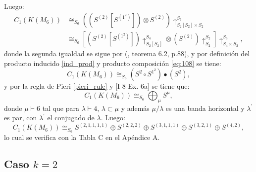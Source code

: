\documentclass[12pt]{book}
\theoremstyle{definition}
\newcounter{in}
\newcounter{ini}
\begin{document}
Luego:
\begin{equation}
\begin{aligned}
C_{1}(K(M_{6})) & \cong_{S_{6}} ((S^{(2)} \left [ S^{(1^{2})} \right ]) \otimes S^{(2)}) \uparrow_{S_{2} \left [ S_{2} \right ] \times S_{2}}^{S_{6}} \\
& \cong_{S_{6}} \left [ (S^{(2)} \left [ S^{(1^{2})} \right ]) \uparrow_{S_{2} \left [ S_{2} \right ]}^{S_{4}} \otimes (S^{(2)}) \uparrow_{S_{2}}^{S_{2}} \right ] \uparrow_{S_{4} \times S_{2}}^{S_{6}},
\end{aligned}
\end{equation}
donde la segunda igualdad se sigue por \normalfont(\cite{karpilovsky1990induced}, teorema 6.2, p.88), y por definición del producto inducido \ref{ind_prod} y producto
composición \ref{eq:108} se tiene:
\begin{equation}
C_{1}(K(M_{6})) \cong_{S_{6}} (S^{2}  \circ S^{1^{2}}) \bullet (S^{2}), 
\end{equation}
y por la regla de Pieri \ref{pieri_rule} y
\cite{macdonald1998symmetric} [I 8 Ex. 6a] se tiene que:
\begin{equation}
C_{1}(K(M_{6})) \cong_{S_{6}} \bigoplus_{\mu} S^{\mu},
\end{equation}
donde $\mu \vdash 6$ tal que para $\lambda \vdash 4$,
$\lambda \subset \mu$ y además $\mu / \lambda$ es una banda horizontal
y $\lambda^{'}$ es par, con $\lambda^{'}$ el conjugado de
$\lambda$. Luego:
\begin{equation}
C_{1}(K(M_{6})) \cong_{S_{6}}  S^{(2,1,1,1,1)} \oplus S^{(2,2,2)} \oplus S^{(3,1,1,1)} \oplus S^{(3,2,1)} \oplus S^{(4,2)},
\end{equation}
lo cual se verifica con la Tabla C en el Apéndice A.

\subsection{Caso $k = 2$}
\label{Ind_est_o_2}
\end{document}

